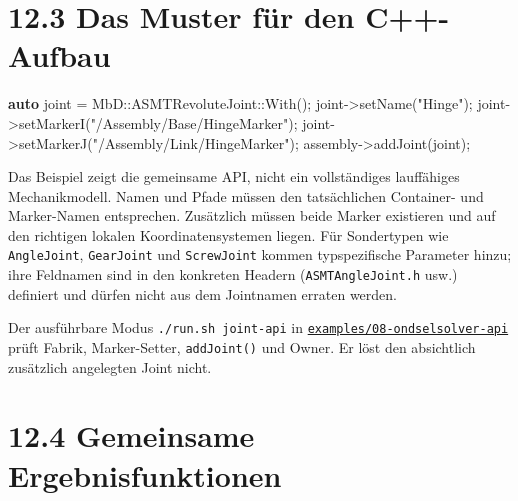 \documentclass[
  12pt
]{book}
\newenvironment{Shaded}{}{}
\newcommand{\KeywordTok}[1]{\textcolor[rgb]{0.00,0.44,0.13}{\textbf{#1}}}
\newcommand{\NormalTok}[1]{#1}
\newcommand{\OperatorTok}[1]{\textcolor[rgb]{0.40,0.40,0.40}{#1}}
\newcommand{\StringTok}[1]{\textcolor[rgb]{0.25,0.44,0.63}{#1}}
\begin{document}
\hypertarget{das-muster-fuxfcr-den-c-aufbau}{%
\section{\texorpdfstring{{12.3} Das Muster für den
C++-Aufbau}{12.3 Das Muster für den C++-Aufbau}}\label{das-muster-fuxfcr-den-c-aufbau}}

\begin{Shaded}
\begin{Highlighting}[]
\KeywordTok{auto}\NormalTok{ joint }\OperatorTok{=}\NormalTok{ MbD}\OperatorTok{::}\NormalTok{ASMTRevoluteJoint}\OperatorTok{::}\NormalTok{With}\OperatorTok{();}
\NormalTok{joint}\OperatorTok{{-}\textgreater{}}\NormalTok{setName}\OperatorTok{(}\StringTok{"Hinge"}\OperatorTok{);}
\NormalTok{joint}\OperatorTok{{-}\textgreater{}}\NormalTok{setMarkerI}\OperatorTok{(}\StringTok{"/Assembly/Base/HingeMarker"}\OperatorTok{);}
\NormalTok{joint}\OperatorTok{{-}\textgreater{}}\NormalTok{setMarkerJ}\OperatorTok{(}\StringTok{"/Assembly/Link/HingeMarker"}\OperatorTok{);}
\NormalTok{assembly}\OperatorTok{{-}\textgreater{}}\NormalTok{addJoint}\OperatorTok{(}\NormalTok{joint}\OperatorTok{);}
\end{Highlighting}
\end{Shaded}

Das Beispiel zeigt die gemeinsame API, nicht ein vollständiges
lauffähiges Mechanikmodell. Namen und Pfade müssen den tatsächlichen
Container- und Marker-Namen entsprechen. Zusätzlich müssen beide Marker
existieren und auf den richtigen lokalen Koordinatensystemen liegen. Für
Sondertypen wie \texttt{AngleJoint}, \texttt{GearJoint} und
\texttt{ScrewJoint} kommen typspezifische Parameter hinzu; ihre
Feldnamen sind in den konkreten Headern (\texttt{ASMTAngleJoint.h} usw.)
definiert und dürfen nicht aus dem Jointnamen erraten werden.

Der ausführbare Modus \texttt{./run.sh\ joint-api} in
\href{./examples/08-ondselsolver-api/README.md}{\texttt{examples/08-ondselsolver-api}}
prüft Fabrik, Marker-Setter, \texttt{addJoint()} und Owner. Er löst den
absichtlich zusätzlich angelegten Joint nicht.

\hypertarget{gemeinsame-ergebnisfunktionen}{%
\section{\texorpdfstring{{12.4} Gemeinsame
Ergebnisfunktionen}{12.4 Gemeinsame Ergebnisfunktionen}}\label{gemeinsame-ergebnisfunktionen}}
\end{document}
